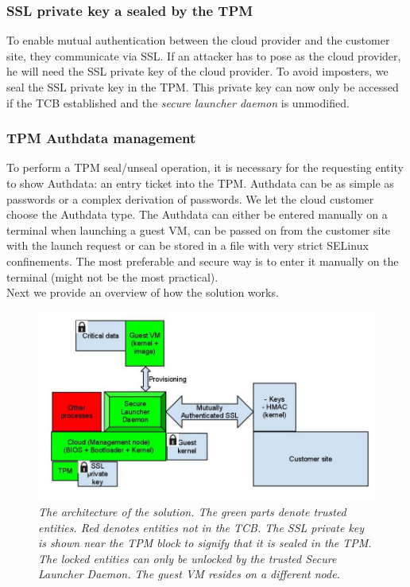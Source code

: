\documentclass[10pt,twocolumn,pdftex]{article}
\begin{document}
\subsubsection{SSL private key a sealed by the TPM}
To enable mutual authentication between the cloud provider and the customer site, they communicate via SSL. If an attacker has to pose as the cloud provider, he will need the SSL private key of the cloud provider. To avoid imposters, we seal the SSL private key in the TPM. This private key can now only be accessed if the TCB established and the \emph{secure launcher daemon} is unmodified.

\subsubsection{TPM Authdata management}
To perform a TPM seal/unseal operation, it is necessary for the requesting entity to show Authdata: an entry ticket into the TPM. Authdata can be as simple as passwords or a complex derivation of passwords. We let the cloud customer choose the Authdata type. The Authdata can either be entered manually on a terminal when launching a guest VM, can be passed on from the customer site with the launch request or can be stored in a file with very strict SELinux confinements. The most preferable and secure way is to enter it manually on the terminal (might not be the most practical). 
\\

Next we provide an overview of how the solution works.

\begin{figure}[htp]
\centering
\includegraphics[scale=0.50]{csc574-solution.jpg}
\caption{\small \sl The architecture of the solution. The green parts denote trusted entities. Red denotes entities not in the TCB. The SSL private key is shown near the TPM block to signify that it is sealed in the TPM. The locked entities can only be unlocked by the trusted Secure Launcher Daemon. The guest VM resides on a different node. }
\label{fig:solution}
\end{figure}
\end{document}
